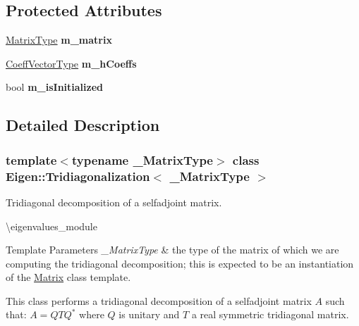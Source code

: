 \subsection*{Protected Attributes}
\begin{DoxyCompactItemize}
\item 
\mbox{\label{class_eigen_1_1_tridiagonalization_ad42459daade3a276a0bb2846e18fabf6}} 
\mbox{\hyperlink{class_eigen_1_1_tridiagonalization_add0f4b2216d0ea8ee0f7d8525deaf0a9}{Matrix\+Type}} {\bfseries m\+\_\+matrix}
\item 
\mbox{\label{class_eigen_1_1_tridiagonalization_a78512d647c0ab9ee6271f7afa5d25140}} 
\mbox{\hyperlink{class_eigen_1_1_matrix}{Coeff\+Vector\+Type}} {\bfseries m\+\_\+h\+Coeffs}
\item 
\mbox{\label{class_eigen_1_1_tridiagonalization_acc6410d0df0ef3deba95d9cdfcd7fd65}} 
bool {\bfseries m\+\_\+is\+Initialized}
\end{DoxyCompactItemize}


\subsection{Detailed Description}
\subsubsection*{template$<$typename \+\_\+\+Matrix\+Type$>$\newline
class Eigen\+::\+Tridiagonalization$<$ \+\_\+\+Matrix\+Type $>$}

Tridiagonal decomposition of a selfadjoint matrix. 

\textbackslash{}eigenvalues\+\_\+module


\begin{DoxyTemplParams}{Template Parameters}
{\em \+\_\+\+Matrix\+Type} & the type of the matrix of which we are computing the tridiagonal decomposition; this is expected to be an instantiation of the \mbox{\hyperlink{class_eigen_1_1_matrix}{Matrix}} class template.\\
\hline
\end{DoxyTemplParams}
This class performs a tridiagonal decomposition of a selfadjoint matrix $ A $ such that\+: $ A = Q T Q^* $ where $ Q $ is unitary and $ T $ a real symmetric tridiagonal matrix.

